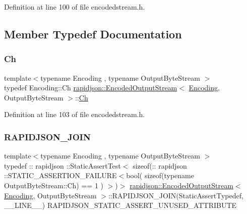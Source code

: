 Definition at line 100 of file encodedstream.\+h.



\subsection{Member Typedef Documentation}
\mbox{\label{classrapidjson_1_1_encoded_output_stream_aa96ac761f570fbdbcc2375ad4edd8b6f}} 
\subsubsection{\texorpdfstring{Ch}{Ch}}
{\footnotesize\ttfamily template$<$typename Encoding , typename Output\+Byte\+Stream $>$ \\
typedef Encoding\+::\+Ch \mbox{\hyperlink{classrapidjson_1_1_encoded_output_stream}{rapidjson\+::\+Encoded\+Output\+Stream}}$<$ \mbox{\hyperlink{classrapidjson_1_1_encoding}{Encoding}}, Output\+Byte\+Stream $>$\+::\mbox{\hyperlink{classrapidjson_1_1_encoded_output_stream_aa96ac761f570fbdbcc2375ad4edd8b6f}{Ch}}}



Definition at line 103 of file encodedstream.\+h.

\mbox{\label{classrapidjson_1_1_encoded_output_stream_af2588d1187d4bca384a37f5699542ba6}} 
\subsubsection{\texorpdfstring{RAPIDJSON\_JOIN}{RAPIDJSON\_JOIN}}
{\footnotesize\ttfamily template$<$typename Encoding , typename Output\+Byte\+Stream $>$ \\
typedef \+:: rapidjson \+::Static\+Assert\+Test$<$ sizeof(\+:: rapidjson \+::S\+T\+A\+T\+I\+C\+\_\+\+A\+S\+S\+E\+R\+T\+I\+O\+N\+\_\+\+F\+A\+I\+L\+U\+RE$<$bool( sizeof(typename Output\+Byte\+Stream\+::\+Ch) == 1 ) $>$)$>$ \mbox{\hyperlink{classrapidjson_1_1_encoded_output_stream}{rapidjson\+::\+Encoded\+Output\+Stream}}$<$ \mbox{\hyperlink{classrapidjson_1_1_encoding}{Encoding}}, Output\+Byte\+Stream $>$\+::R\+A\+P\+I\+D\+J\+S\+O\+N\+\_\+\+J\+O\+IN(Static\+Assert\+Typedef, \+\_\+\+\_\+\+L\+I\+N\+E\+\_\+\+\_\+) R\+A\+P\+I\+D\+J\+S\+O\+N\+\_\+\+S\+T\+A\+T\+I\+C\+\_\+\+A\+S\+S\+E\+R\+T\+\_\+\+U\+N\+U\+S\+E\+D\+\_\+\+A\+T\+T\+R\+I\+B\+U\+TE\hspace{0.3cm}{\ttfamily [private]}}



